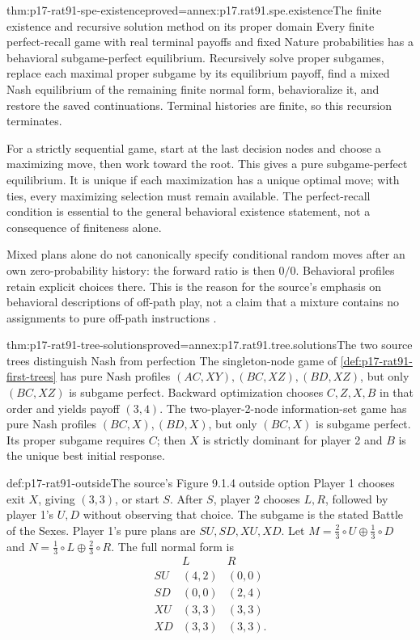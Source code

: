 \begin{hbtheorem}{thm:p17-rat91-spe-existence}{proved=annex:p17.rat91.spe.existence}{The finite existence and recursive solution method on its proper domain}
Every finite perfect-recall game with real terminal payoffs and fixed
Nature probabilities has a behavioral subgame-perfect equilibrium.
Recursively solve proper subgames, replace each maximal proper subgame
by its equilibrium payoff, find a mixed Nash equilibrium of the
remaining finite normal form, behavioralize it, and restore the saved
continuations. Terminal histories are finite, so this recursion terminates.

For a strictly sequential game, start at the last decision nodes and
choose a maximizing move, then work toward the root. This gives a pure
subgame-perfect equilibrium. It is unique if each maximization has a
unique optimal move; with ties, every maximizing selection must remain
available. The perfect-recall condition is essential to the general
behavioral existence statement, not a consequence of finiteness alone.
\end{hbtheorem}

Mixed plans alone do not canonically specify conditional random moves
after an own zero-probability history: the forward ratio is then \(0/0\).
Behavioral profiles retain explicit choices there. This is the reason
for the source's emphasis on behavioral descriptions of off-path play,
not a claim that a mixture contains no assignments to pure off-path
instructions \parencite[pp.~533--535]{AlbertKliemt2021ClassicalGameTheory}.

\begin{hbtheorem}{thm:p17-rat91-tree-solutions}{proved=annex:p17.rat91.tree.solutions}{The two source trees distinguish Nash from perfection}
The singleton-node game of \cref{def:p17-rat91-first-trees} has
pure Nash profiles \((AC,XY),(BC,XZ),(BD,XZ)\), but only
\((BC,XZ)\) is subgame perfect. Backward optimization chooses
\(C,Z,X,B\) in that order and yields payoff \((3,4)\).
The two-player-2-node information-set game has pure Nash profiles
\((BC,X),(BD,X)\), but only \((BC,X)\) is subgame perfect.
Its proper subgame requires \(C\); then \(X\) is strictly dominant
for player 2 and \(B\) is the unique best initial response.
\end{hbtheorem}

\begin{hbdefinition}{def:p17-rat91-outside}{The source's Figure 9.1.4 outside option}
Player 1 chooses exit \(X\), giving \((3,3)\), or start \(S\).
After \(S\), player 2 chooses \(L,R\), followed by player 1's
\(U,D\) without observing that choice. The subgame is the stated
Battle of the Sexes. Player 1's pure plans are \(SU,SD,XU,XD\).
Let \(M=\tfrac23\circ U\oplus\tfrac13\circ D\) and
\(N=\tfrac13\circ L\oplus\tfrac23\circ R\).
The full normal form is
\[
\begin{array}{c|cc}&L&R\\\hline
 SU&(4,2)&(0,0)\\SD&(0,0)&(2,4)\\
 XU&(3,3)&(3,3)\\XD&(3,3)&(3,3).
\end{array}
\]
\end{hbdefinition}

